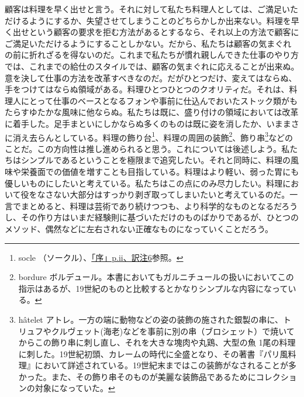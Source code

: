 \begin{Main}
顧客は料理を早く出せと言う。それに対して私たち料理人としては、ご満足いただけるようにするか、失望させてしまうことのどちらかしか出来ない。料理を早く出せという顧客の要求を拒む方法があるとするなら、それ以上の方法で顧客にご満足いただけるようにすることしかない。だから、私たちは顧客の気まぐれの前に折れざるを得ないのだ。これまで私たちが慣れ親しんできた仕事のやり方では、これまでの給仕のスタイルでは、顧客の気まぐれに応えることが出来ぬ。意を決して仕事の方法を改革すべきなのだ。だがひとつだけ、変えてはならぬ、手をつけてはならぬ領域がある。料理ひとつひとつのクオリティだ。それは、料理人にとって仕事のベースとなるフォンや事前に仕込んでおいたストック類がもたらすゆたかな風味に他ならぬ。私たちは既に、盛り付けの領域においては改革に着手した。足手まといにしかならぬ多くのものは既に姿を消したか、いままさに消え去らんとしている。料理の飾り台\footnote{socle
  （ソークル）、\protect\hyperlink{socle}{「序」p.ii、訳注6}参照。}、料理の周囲の装飾\footnote{bordure
  ボルデュール。本書においてもガルニチュールの扱いにおいてこの指示はあるが、19世紀のものと比較するとかなりシンプルな内容になっている。}、飾り串\footnote{hâtelet
  アトレ。一方の端に動物などの姿の装飾の施された銀製の串に、トリュフやクルヴェット(海老)などを事前に別の串（ブロシェット）で焼いてからこの飾り串に刺し直し、それを大きな塊肉や丸鶏、大型の魚
  1尾の料理に刺した。19世紀初頭、カレームの時代に全盛となり、その著書『パリ風料理』において詳述されている。19世紀末まではこの装飾がなされることが多かった。また、その飾り串そのものが美麗な装飾品であるためにコレクションの対象になっていた。}などのことだ。この方向性は推し進められると思う。これについては後述しよう。私たちはシンプルであるということを極限まで追究したい。それと同時に、料理の風味や栄養面での価値を増すことも目指している。料理はより軽い、弱った胃にも優しいものにしたいと考えている。私たちはこの点にのみ尽力したい。料理において役をなさない大部分はすっかり剥ぎ取ってしまいたいと考えているのだ。一言でまとめると、料理は芸術であり続けつつも、より科学的なものとなるだろうし、その作り方はいまだ経験則に基づいただけのものばかりであるが、ひとつのメソッド、偶然などに左右されない正確なものになっていくことだろう。


\end{Main}
